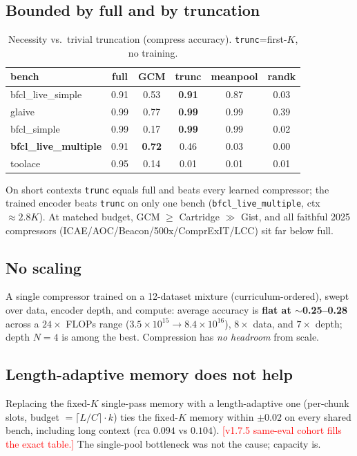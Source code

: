 \documentclass[11pt]{article}
\newcommand{\TODO}[1]{\textcolor{red}{[#1]}}
\begin{document}
\subsection{Bounded by full and by truncation}\label{sec:trivial}
\begin{table}[t]\centering\small
\caption{Necessity vs.\ trivial truncation (compress accuracy). \texttt{trunc}=first-$K$, no training.}
\label{tab:trivial}
\begin{tabular}{lccccc}
\toprule
bench & full & GCM & \textbf{trunc} & meanpool & randk \\
\midrule
bfcl\_live\_simple & 0.91 & 0.53 & \textbf{0.91} & 0.87 & 0.03 \\
glaive & 0.99 & 0.77 & \textbf{0.99} & 0.99 & 0.39 \\
bfcl\_simple & 0.99 & 0.17 & \textbf{0.99} & 0.99 & 0.02 \\
\textbf{bfcl\_live\_multiple} & 0.91 & \textbf{0.72} & 0.46 & 0.03 & 0.00 \\
toolace & 0.95 & 0.14 & 0.01 & 0.01 & 0.01 \\
\bottomrule
\end{tabular}
\end{table}
On short contexts \texttt{trunc} equals full and beats every learned compressor; the trained encoder beats
\texttt{trunc} on only one bench (\texttt{bfcl\_live\_multiple}, ctx $\approx2.8K$). At matched budget,
GCM $\ge$ Cartridge $\gg$ Gist, and all faithful 2025 compressors (ICAE/AOC/Beacon/500x/ComprExIT/LCC) sit far
below full.

\subsection{No scaling}\label{sec:scaling}
A single compressor trained on a 12-dataset mixture (curriculum-ordered), swept over data, encoder depth, and
compute: average accuracy is \textbf{flat at $\sim$0.25--0.28} across a $24\times$ FLOPs range
($3.5\!\times\!10^{15}\!\to\!8.4\!\times\!10^{16}$), $8\times$ data, and $7\times$ depth; depth $N{=}4$ is among
the best. Compression has \emph{no headroom} from scale.

\subsection{Length-adaptive memory does not help}\label{sec:lenadapt}
Replacing the fixed-$K$ single-pass memory with a length-adaptive one (per-chunk slots, budget $=\lceil
L/C\rceil\!\cdot\!k$) ties the fixed-$K$ memory within $\pm0.02$ on every shared bench, including long context
(rca $0.094$ vs $0.104$). \TODO{v1.7.5 same-eval cohort fills the exact table.} The single-pool bottleneck was
not the cause; capacity is.
\end{document}
